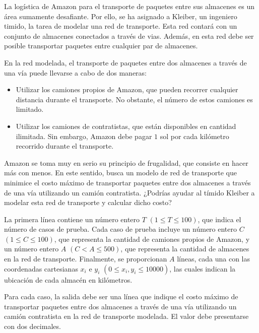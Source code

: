 
La logística de Amazon para el transporte de paquetes entre sus almacenes es un área sumamente desafiante. Por ello, se ha asignado a Kleiber, un ingeniero timido, la tarea de modelar una red de transporte. Esta red contará con un conjunto de almacenes conectados a través de vias. Además, en esta red debe ser posible transportar paquetes entre cualquier par de almacenes.

En la red modelada, el transporte de paquetes entre dos almacenes a través de una vía puede llevarse a cabo de dos maneras:
 \begin{itemize}
    \item Utilizar los camiones propios de Amazon, que pueden recorrer cualquier distancia durante el transporte. No obstante, el número de estos camiones es limitado.
    \item Utilizar los camiones de contratistas, que están disponibles en cantidad ilimitada. Sin embargo, Amazon debe pagar $1$ sol por cada kilómetro recorrido durante el transporte.
\end{itemize}
Amazon se toma muy en serio su principio de frugalidad, que consiste en hacer más con menos. En este sentido, busca un modelo de red de transporte que minimice el costo máximo de transportar paquetes entre dos almacenes a través de una vía utilizando un camión contratista. ¿Podrías ayudar al tímido Kleiber a modelar esta red de transporte y calcular dicho costo?


La primera línea contiene un número entero $T$ $(1 \leq T \leq 100)$, que indica el número de casos de prueba. Cada caso de prueba incluye un número entero $C$ $(1 \leq C \leq 100)$, que representa la cantidad de camiones propios de Amazon, y un número entero $A$ $(C < A \leq 500)$, que representa la cantidad de almacenes en la red de transporte. Finalmente, se proporcionan $A$ líneas, cada una con las coordenadas cartesianas $x_i$ e $y_i$ $(0 \leq x_i, y_i \leq 10000)$, las cuales indican la ubicación de cada almacén en kilómetros.

\outputText

Para cada caso, la salida debe ser una línea que indique el costo máximo de transportar paquetes entre dos almacenes a través de una vía utilizando un camión contratista en la red de transporte modelada. El valor debe presentarse con dos decimales.

